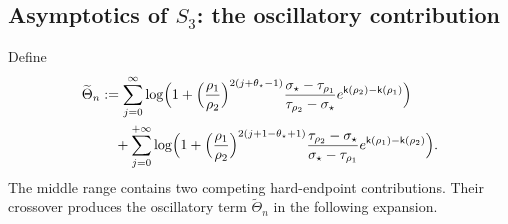 \documentclass[a4paper]{article}
\numberwithin{equation}{section}
\begin{document}
\subsection{Asymptotics of \texorpdfstring{$S_3$}{S3 (annular)}: the oscillatory contribution}
Define
\begin{align}
    \begin{split}
\label{def of tilde Theta n}
    \widetilde{\Theta}_n&:=\sum_{j=0}^{\infty}\log\Bigl(1+\Bigl(\frac{\rho_1}{\rho_2}\Bigr)^{2(j+\theta_{\star}-1)}\frac{\sigma_{\star}-\tau_{\rho_1}}{\tau_{\rho_2}-\sigma_{\star}}e^{\mathsf{k}(\rho_2)-\mathsf{k}(\rho_1)}\Bigr)
\\
&\quad 
+
\sum_{j=0}^{+\infty}\log\Bigl( 
1+\Bigl(\frac{\rho_1}{\rho_2}\Bigr)^{2(j+1-\theta_{\star}+1)}\frac{\tau_{\rho_2}-\sigma_{\star}}{\sigma_{\star}-\tau_{\rho_1}}e^{\mathsf{k}(\rho_1)-\mathsf{k}(\rho_2)}
\Bigr).
    \end{split}
\end{align} 
The middle range contains two competing hard-endpoint contributions. Their crossover produces the oscillatory term $\widetilde\Theta_n$ in the following expansion.
\end{document}
